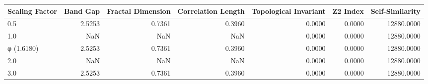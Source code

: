 \begin{tabular}{lrrrrrr}
\toprule
Scaling Factor & Band Gap & Fractal Dimension & Correlation Length & Topological Invariant & Z2 Index & Self-Similarity \\
\midrule
0.5 & 2.5253 & 0.7361 & 0.3960 & 0.0000 & 0.0000 & 12880.0000 \\
1.0 & NaN & NaN & NaN & 0.0000 & 0.0000 & 12880.0000 \\
φ (1.6180) & 2.5253 & 0.7361 & 0.3960 & 0.0000 & 0.0000 & 12880.0000 \\
2.0 & NaN & NaN & NaN & 0.0000 & 0.0000 & 12880.0000 \\
3.0 & 2.5253 & 0.7361 & 0.3960 & 0.0000 & 0.0000 & 12880.0000 \\
\bottomrule
\end{tabular}
